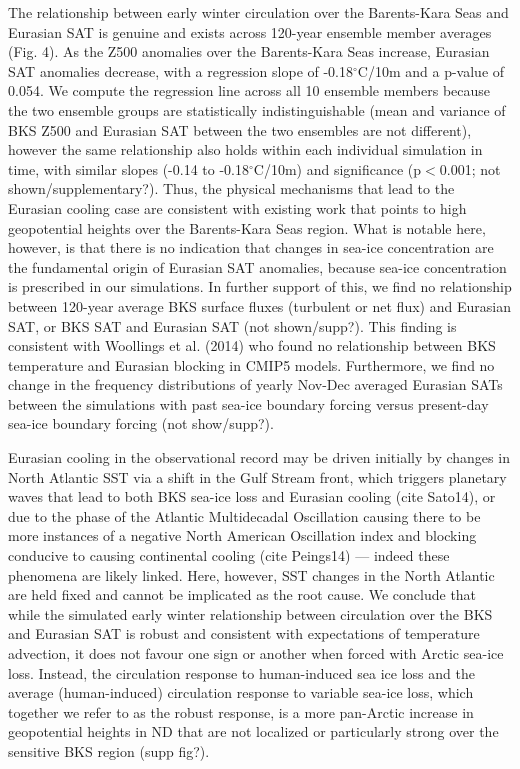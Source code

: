\documentclass[grl]{AGUTeX}  %
\begin{document}
\begin{article}
The relationship between early winter circulation over the Barents-Kara Seas and Eurasian SAT is genuine and exists across 120-year ensemble member averages (Fig. 4). As the Z500 anomalies over the Barents-Kara Seas increase, Eurasian SAT anomalies decrease, with a regression slope of -0.18$^\circ$C/10m and a p-value of 0.054. We compute the regression line across all 10 ensemble members because the two ensemble groups are statistically indistinguishable (mean and variance of BKS Z500 and Eurasian SAT between the two ensembles are not different), however the same relationship also holds within each individual simulation in time, with similar slopes (-0.14 to -0.18$^\circ$C/10m) and significance (p$<$0.001; not shown/supplementary?). Thus, the physical mechanisms that lead to the Eurasian cooling case are consistent with existing work that points to high geopotential heights over the Barents-Kara Seas region. What is notable here, however, is that there is no indication that changes in sea-ice concentration are the fundamental origin of Eurasian SAT anomalies, because sea-ice concentration is prescribed in our simulations. In further support of this, we find no relationship between 120-year average BKS surface fluxes (turbulent or net flux) and Eurasian SAT, or BKS SAT and Eurasian SAT (not shown/supp?). This finding is consistent with Woollings et al. (2014) who found no relationship between BKS temperature and Eurasian blocking in CMIP5 models. Furthermore, we find no change in the frequency distributions of yearly Nov-Dec averaged Eurasian SATs between the simulations with past sea-ice boundary forcing versus present-day sea-ice boundary forcing (not show/supp?).

Eurasian cooling in the observational record may be driven initially by changes in North Atlantic SST via a shift in the Gulf Stream front, which triggers planetary waves that lead to both BKS sea-ice loss and Eurasian cooling (cite Sato14), or due to the phase of the Atlantic Multidecadal Oscillation causing there to be more instances of a negative North American Oscillation index and blocking conducive to causing continental cooling (cite Peings14) --- indeed these phenomena are likely linked. Here, however, SST changes in the North Atlantic are held fixed and cannot be implicated as the root cause. We conclude that while the simulated early winter relationship between circulation over the BKS and Eurasian SAT is robust and consistent with expectations of temperature advection, it does not favour one sign or another when forced with Arctic sea-ice loss. Instead, the circulation response to human-induced sea ice loss and the average (human-induced) circulation response to variable sea-ice loss, which together we refer to as the robust response, is a more pan-Arctic increase in geopotential heights in ND that are not localized or particularly strong over the sensitive BKS region (supp fig?). 



\end{article}
\end{document}
